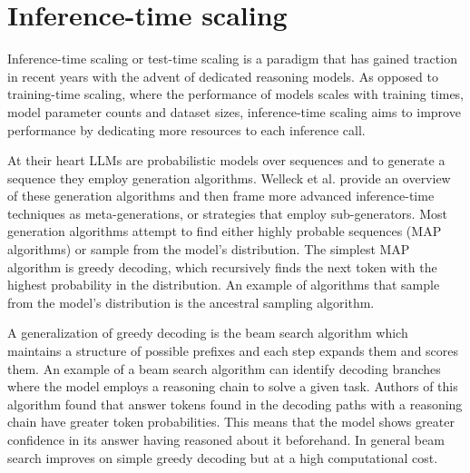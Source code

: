 \section{Inference-time scaling}
Inference-time scaling or test-time scaling is a paradigm that has gained traction in recent years
with the advent of dedicated reasoning models\cite{openai2024openaio1card}\cite{deepseekai2025deepseekr1incentivizingreasoningcapability}. 
As opposed to training-time scaling, where the performance of models scales with 
training times, model parameter counts and dataset sizes\cite{kaplan2020scalinglawsneurallanguage},
inference-time scaling aims to improve performance by dedicating more resources to each inference call.

At their heart LLMs are probabilistic models over sequences and to generate a sequence they employ generation algorithms. 
Welleck et al.\cite{welleck2024decodingmetagenerationinferencetimealgorithms} provide an overview of these generation algorithms
and then frame more advanced inference-time techniques as meta-generations, or strategies that employ sub-generators.
Most generation algorithms attempt to find either highly probable sequences (MAP algorithms) or sample from the model's distribution.
The simplest MAP algorithm is greedy decoding, which recursively finds the next token with the highest probability in the distribution.
An example of algorithms that sample from the model's distribution is the ancestral sampling algorithm.

A generalization of greedy decoding is the beam search algorithm which maintains a structure of possible prefixes and each step expands them and scores them.
An example\cite{wang2024chainofthoughtreasoningprompting} of a beam search algorithm can identify decoding branches where the model 
employs a reasoning chain to solve a given task. Authors of this algorithm found that answer tokens found in the decoding paths with a reasoning chain 
have greater token probabilities. This means that the model shows greater confidence in its answer having reasoned about it beforehand.
In general beam search improves on simple greedy decoding but at a high computational cost\cite{welleck2024decodingmetagenerationinferencetimealgorithms}.

